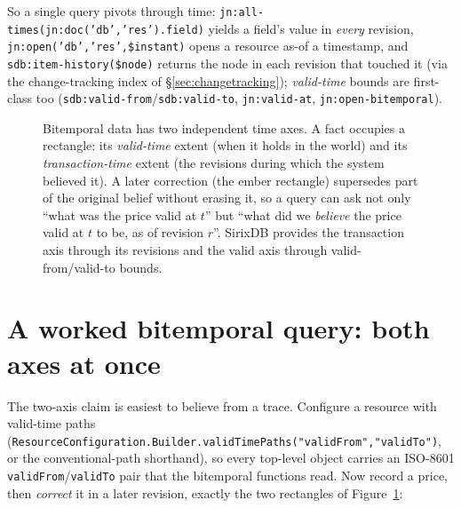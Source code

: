 \documentclass[11pt,a4paper,oneside]{report}
\theoremstyle{sirixthm}
\newcommand{\code}[1]{\texttt{#1}}
\begin{document}
So a single query pivots through time: \code{jn:all-times(jn:doc('db','res').field)} yields a field's
value in \emph{every} revision, \code{jn:open('db','res',\$instant)} opens a resource as-of a timestamp,
and \code{sdb:item-history(\$node)} returns the node in each revision that touched it (via the
change-tracking index of \S\ref{sec:changetracking}); \emph{valid-time} bounds are first-class too
(\code{sdb:valid-from}/\allowbreak\code{sdb:valid-to}, \code{jn:valid-at}, \code{jn:open-bitemporal}).

\begin{figure}[t]
\centering
{}
\caption{Bitemporal data has two independent time axes. A fact occupies a rectangle: its
\emph{valid-time} extent (when it holds in the world) and its \emph{transaction-time} extent (the
revisions during which the system believed it). A later correction (the ember rectangle) supersedes part
of the original belief without erasing it, so a query can ask not only ``what was the price valid at
$t$'' but ``what did we \emph{believe} the price valid at $t$ to be, as of revision $r$''. SirixDB
provides the transaction axis through its revisions and the valid axis through valid-from/valid-to
bounds.}
\label{fig:bitemporal}
\end{figure}

\section{A worked bitemporal query: both axes at once}
\label{sec:bitemporal-worked}

The two-axis claim is easiest to believe from a trace. Configure a resource with valid-time paths
(\code{ResourceConfiguration.Builder.validTimePaths("validFrom","validTo")}, or the conventional-path
shorthand), so every top-level object carries an ISO-8601 \code{validFrom}/\allowbreak\code{validTo} pair that the
bitemporal functions read. Now record a price, then \emph{correct} it in a later revision, exactly the
two rectangles of Figure~\ref{fig:bitemporal}:
\end{document}
